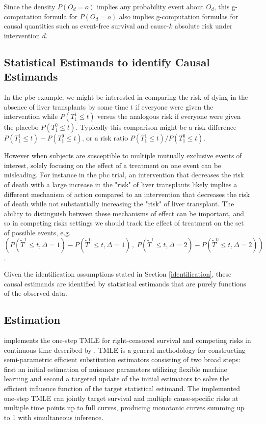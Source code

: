 \documentclass{report}
\newcommand{\1}{\ensuremath{\mathbf{1}}}
\newcommand{\T}{\ensuremath{\widetilde{T}}}
\begin{document}
Since the density \(P(O_d=o)\) implies any probability event about \(O_d\), this g-computation formula for \(P(O_d=o)\) also implies g-computation formulas for causal quantities such as event-free survival and cause-\(k\) absolute risk under intervention \(d\). 

\subsection{Statistical Estimands to identify Causal Estimands}
\label{sec:orge8ea5c9}

In the pbc example, we might be interested in comparing the risk of dying in the absence of liver transplants by some time \(t\) if everyone were given the intervention while  \(P(T^1_1 \leq t)\) versus the analogous risk if everyone were given the placebo \(P(T^0_1 \leq t)\). Typically this comparison might be a risk difference \(P(T^1_1 \leq t) - P(T^0_1 \leq t)\), or a risk ratio \(P(T^1_1 \leq t) / P(T^0_1 \leq t)\).

However when subjects are susceptible to multiple mutually exclusive events of interest, solely focusing on the effect of a treatment on one event can be misleading. For instance in the pbc trial, an intervention that decreases the risk of death with a large increase in the "risk" of liver transplants likely implies a different mechanism of action compared to an intervention that decreases the risk of death while not substantially increasing the "risk" of liver transplant. The ability to distinguish between these mechanisms of effect can be important, and so in competing risks settings we should track the effect of treatment on the set of possible events, e.g. \(\left(P(\T^1 \leq t, \Delta = 1) - P(\T^0 \leq t, \Delta = 1)\,,\;P(\T^1 \leq t, \Delta = 2) - P(\T^0 \leq t, \Delta = 2)\right)\).

Given the identification assumptions stated in Section \ref{identification}, these causal estimands are identified by statistical estimands that are purely functions of the observed data.

\subsection{Estimation}
\label{sec:org302ee9e}
 implements the one-step TMLE for right-censored survival and competing risks in continuous time described by \cite{rytgaard2021one}. TMLE is a general methodology for constructing semi-parametric efficient substitution estimators consisting of two broad steps: first an initial estimation of nuisance parameters utilizing flexible machine learning and second a targeted update of the initial estimators to solve the efficient influence function of the target statistical estimand. The implemented one-step TMLE can jointly target survival and multiple cause-specific risks at multiple time points up to full curves, producing monotonic curves summing up to 1 with simultaneous inference.
\end{document}
